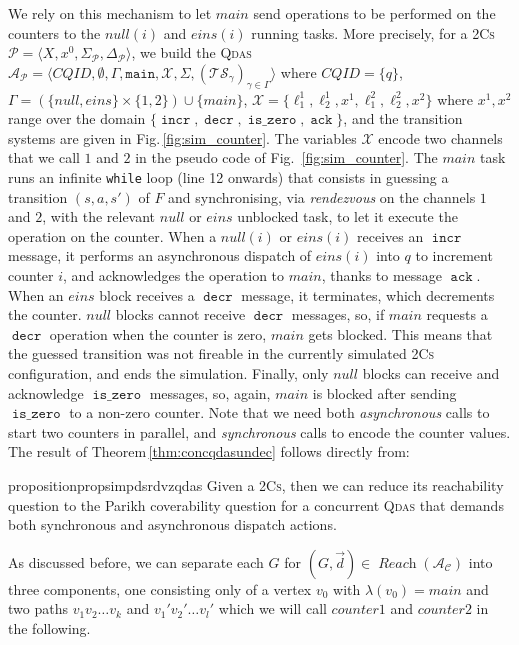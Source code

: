 \documentclass[runningheads,oribibl,]{article}
\newcommand{\tuple}[1]{\langle#1\rangle\xspace}
\newcommand{\Aa}{\ensuremath{\mathcal{A}}\xspace}
\newcommand{\Cc}{\ensuremath{\mathcal{C}}\xspace}
\newcommand{\Pp}{\ensuremath{\mathcal{P}}\xspace}
\newcommand{\Ts}{\ensuremath{\mathcal{TS}}\xspace}
\newcommand{\Xx}{\ensuremath{\mathcal{X}}\xspace}
\newcommand{\cfont}[1]{\ensuremath{\mathtt{#1}}\xspace}
\newcommand{\main}{\ensuremath{\textit{main}}\xspace}
\DeclareMathOperator{\incr}{\cfont{incr}}
\DeclareMathOperator{\decr}{\cfont{decr}}
\DeclareMathOperator{\zerotest}{\cfont{is\_zero}}
\DeclareMathOperator{\ack}{\cfont{ack}}
\newcommand{\CQID}{CQID\xspace}
\newcommand{\qdas}{\textsc{Qdas}\xspace}
\newcommand{\twocs}{2\textsc{Cs}\xspace}
\newcommand{\QDAS}{\ensuremath{\tuple{\CQID, \emptyset,\allowbreak \Gamma,
\allowbreak \mathtt{main},\allowbreak \Xx,\allowbreak \Sigma,\allowbreak
(\Ts_\gamma)_{\gamma\in\Gamma}}}}
\DeclareMathOperator{\Reach}{\textit{Reach}}
\newcommand{\Graph}{\ensuremath{G}}
\newcommand{\Data}{\ensuremath{\vec{d}}}
\begin{document}
We rely on this mechanism to let \main send operations to be performed
on the counters to the $null(i)$ and $eins(i)$ running tasks. More
precisely, for a \twocs $\Pp=\tuple{X,x^0,\Sigma_\Pp,\Delta_\Pp}$, we
build the \qdas $\Aa_\Pp=\QDAS$ where $\CQID=\{q\}$,
$\Gamma=(\{null,eins\}\times\{1,2\})\cup\{\main\}$,
$\Xx=\{\ell_1^1,\ell_2^1,x^1,\ell_1^2,\ell_2^2,x^2\}$ where $x^1,x^2$
range over the domain $\{\incr,\decr,\zerotest,\ack\}$, and the
transition systems are given in Fig.\,\ref{fig:sim_counter}. The
variables $\Xx$ encode two channels that we call $1$ and $2$ in the
pseudo code of Fig.~\ref{fig:sim_counter}. The \main task runs an
infinite \texttt{while} loop (line 12 onwards) that consists in
guessing a transition $(s,a,s')$ of $F$ and synchronising, via
\emph{rendezvous} on the channels $1$ and $2$, with the relevant
$null$ or $eins$ unblocked task, to let it execute the operation on
the counter. When a $null(i)$ or $eins(i)$ receives an $\incr$
message, it performs an asynchronous dispatch of $eins(i)$ into $q$ to
increment counter $i$, and acknowledges the operation to \main, thanks
to message $\ack$. When an $eins$ block receives a $\decr$ message, it
terminates, which decrements the counter. $null$ blocks cannot receive
$\decr$ messages, so, if \main requests a $\decr$ operation when the
counter is zero, \main gets blocked. This means that the guessed
transition was not fireable in the currently simulated \twocs configuration, and ends the
simulation. Finally, only $null$ blocks can receive and acknowledge
$\zerotest$ messages, so, again, \main is blocked after sending
$\zerotest$ to a non-zero counter.
Note that we need both \emph{asynchronous} calls to start two counters
in parallel, and \emph{synchronous} calls to encode the counter
values. The result of Theorem\,\ref{thm:concqdasundec} follows
directly from:

\begin{restatable}{proposition}{propsimpdsrdvzqdas}
  \label{prop:sim_pds_rdvz_qdas}
  Given a \twocs,
  then we can reduce its reachability question
  to the Parikh coverability question for a concurrent \qdas that demands
  both synchronous and asynchronous dispatch actions.
\end{restatable}


As discussed before, we can separate each $\Graph$ for
$(\Graph,\Data)\in\Reach(\Aa_\Cc)$ into three components, one
consisting only of a vertex $v_0$ with $\lambda(v_0)=\main$
and two paths $v_1 v_2 \dots v_k$ and $v_1'v_2'\dots v_l'$ which
we will call $counter1$ and $counter2$ in the following.
\end{document}
